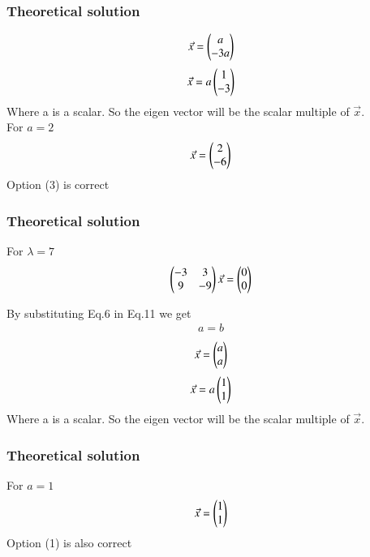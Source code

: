 \documentclass{beamer}
\begin{document}
     \begin{frame}
    \frametitle{Theoretical solution}
\begin{align}
    \Vec{x}=\begin{pmatrix}a\\-3a\end{pmatrix}
\end{align}
\begin{align}
    \Vec{x}=a\begin{pmatrix}1\\-3\end{pmatrix}
\end{align}
Where a is a scalar. So the eigen vector will be the scalar multiple of $\Vec{x}$.\\
For $a=2$
\begin{align}
    \Vec{x}=\begin{pmatrix}2\\-6\end{pmatrix}
\end{align}
Option (3) is correct



    \end{frame}

     \begin{frame}
    \frametitle{Theoretical solution}
For  $\lambda=7$
\begin{align}
 \begin{pmatrix}-3&3\\9&-9\end{pmatrix}\Vec{x}=\begin{pmatrix}0\\0\end{pmatrix}
\end{align}

By substituting Eq.6 in Eq.11 we get
\begin{align}
    a=b
\end{align}
\begin{align}
    \Vec{x}=\begin{pmatrix}a\\a\end{pmatrix}
\end{align}
\begin{align}
    \Vec{x}=a\begin{pmatrix}1\\1\end{pmatrix}
\end{align}
Where a is a scalar. So the eigen vector will be the scalar multiple of $\Vec{x}$.\\


    \end{frame}

       \begin{frame}
    \frametitle{Theoretical solution}
For $a=1$
\begin{align}
    \Vec{x}=\begin{pmatrix}1\\1\end{pmatrix}
\end{align}
Option (1) is also correct

    \end{frame}
    
    
    
\end{document}
